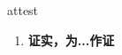 
\begin{frame}
{\huge attest}
\begin{center}
\begin{enumerate}\Large
  \item \textbf{证实，为...作证}
\end{enumerate}
\end{center}
\end{frame}
